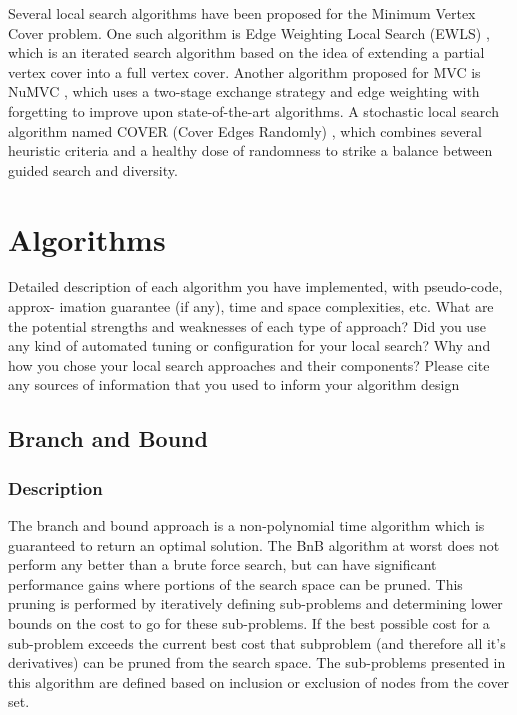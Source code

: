 \documentclass[acmlarge]{acmart}
\begin{document}
Several local search algorithms have been proposed for the Minimum Vertex Cover problem. One such algorithm is Edge Weighting Local Search (EWLS) \cite{cai2010ewls}, which is an iterated search algorithm based on the idea of extending a partial vertex cover into a full vertex cover. Another algorithm proposed for MVC is NuMVC \cite{cai2013numvc}, which uses a two-stage exchange strategy and edge weighting with forgetting to improve upon state-of-the-art algorithms. A stochastic local search algorithm named COVER (Cover Edges Randomly) \cite{richter2007stochastic}, which combines several heuristic criteria and a healthy dose of randomness to strike a balance between guided search and diversity.

\section{Algorithms}

Detailed description of each algorithm you have implemented, with pseudo-code, approx-
imation guarantee (if any), time and space complexities, etc. What are the potential strengths and
weaknesses of each type of approach? Did you use any kind of automated tuning or configuration for
your local search? Why and how you chose your local search approaches and their components? Please
cite any sources of information that you used to inform your algorithm design

\subsection{Branch and Bound}

\subsubsection{Description}

The branch and bound approach is a non-polynomial time algorithm which is guaranteed to return an optimal solution. The BnB algorithm at worst does not perform any better than a brute force search, but can have significant performance gains where portions of the search space can be pruned. This pruning is performed by iteratively defining sub-problems and determining lower bounds on the cost to go for these sub-problems. If the best possible cost for a sub-problem exceeds the current best cost that subproblem (and therefore all it's derivatives) can be pruned from the search space. The sub-problems presented in this algorithm are defined based on inclusion or exclusion of nodes from the cover set. 
\end{document}
